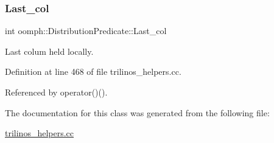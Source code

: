 \subsubsection{\texorpdfstring{Last\+\_\+col}{Last\_col}}
{\footnotesize\ttfamily int oomph\+::\+Distribution\+Predicate\+::\+Last\+\_\+col\hspace{0.3cm}{\ttfamily [private]}}



Last colum held locally. 



Definition at line 468 of file trilinos\+\_\+helpers.\+cc.



Referenced by operator()().



The documentation for this class was generated from the following file\+:\begin{DoxyCompactItemize}
\item 
\hyperlink{trilinos__helpers_8cc}{trilinos\+\_\+helpers.\+cc}\end{DoxyCompactItemize}
